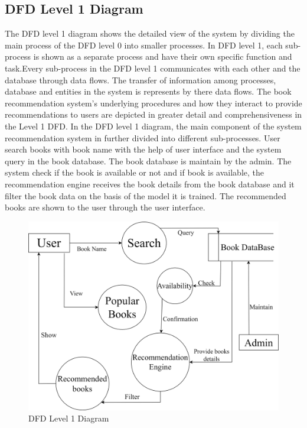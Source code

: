 \subsection{DFD Level 1 Diagram}
The DFD level 1 diagram shows the detailed view of the system by dividing the main process of the DFD level 0 into smaller processes. In DFD level 1, each sub-process is shown as a separate process and have their own specific function and task.Every sub-process in the DFD level 1 communicates with each other and the database through data flows. The transfer of information among processes, database and entities in the system is represents by there data flows. The book recommendation system's underlying procedures and how they interact to provide recommendations to users are depicted in greater detail and comprehensiveness in the Level 1 DFD. In the DFD level 1 diagram, the main component of the system recommendation system in further divided into different sub-processes. User search books with book name with the help of user interface and the system query in the book database. The book database is maintain by the admin. The system check if the book is available or not and if book is available, the recommendation engine receives the book details from the book database and it filter the book data on the basis of the model it is trained. The recommended books are shown to the user through the user interface.   
\vspace{1cm}
\begin{figure}[h]
    \centering
    \includegraphics[width=1\linewidth]{img/Graphics/DFD_level_1.drawio.png}
    \caption{DFD Level 1 Diagram}
    \label{DFD level 1}
\end{figure}

